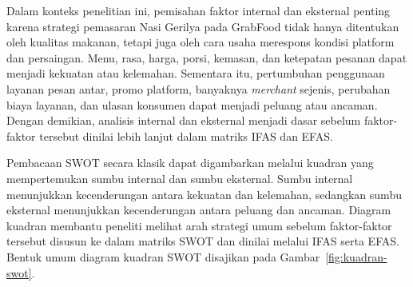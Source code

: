 Dalam konteks penelitian ini, pemisahan faktor internal dan eksternal penting karena strategi pemasaran Nasi Gerilya pada GrabFood tidak hanya ditentukan oleh kualitas makanan, tetapi juga oleh cara usaha merespons kondisi platform dan persaingan. Menu, rasa, harga, porsi, kemasan, dan ketepatan pesanan dapat menjadi kekuatan atau kelemahan. Sementara itu, pertumbuhan penggunaan layanan pesan antar, promo platform, banyaknya \textit{merchant} sejenis, perubahan biaya layanan, dan ulasan konsumen dapat menjadi peluang atau ancaman. Dengan demikian, analisis internal dan eksternal menjadi dasar sebelum faktor-faktor tersebut dinilai lebih lanjut dalam matriks IFAS dan EFAS.

Pembacaan SWOT secara klasik dapat digambarkan melalui kuadran yang mempertemukan sumbu internal dan sumbu eksternal. Sumbu internal menunjukkan kecenderungan antara kekuatan dan kelemahan, sedangkan sumbu eksternal menunjukkan kecenderungan antara peluang dan ancaman. Diagram kuadran membantu peneliti melihat arah strategi umum sebelum faktor-faktor tersebut disusun ke dalam matriks SWOT dan dinilai melalui IFAS serta EFAS. Bentuk umum diagram kuadran SWOT disajikan pada Gambar~\ref{fig:kuadran-swot}.

